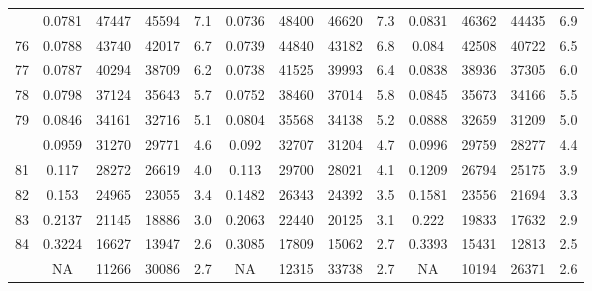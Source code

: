 \documentclass[
  14pt,
]{article}
\begin{document}
\begin{longtable}[t]{lcccccccccccc}
\addlinespace
75 & 0.0781 & 47447 & 45594 & 7.1 & 0.0736 & 48400 & 46620 & 7.3 & 0.0831 & 46362 & 44435 & 6.9\\
76 & 0.0788 & 43740 & 42017 & 6.7 & 0.0739 & 44840 & 43182 & 6.8 & 0.084 & 42508 & 40722 & 6.5\\
77 & 0.0787 & 40294 & 38709 & 6.2 & 0.0738 & 41525 & 39993 & 6.4 & 0.0838 & 38936 & 37305 & 6.0\\
78 & 0.0798 & 37124 & 35643 & 5.7 & 0.0752 & 38460 & 37014 & 5.8 & 0.0845 & 35673 & 34166 & 5.5\\
79 & 0.0846 & 34161 & 32716 & 5.1 & 0.0804 & 35568 & 34138 & 5.2 & 0.0888 & 32659 & 31209 & 5.0\\
\addlinespace
80 & 0.0959 & 31270 & 29771 & 4.6 & 0.092 & 32707 & 31204 & 4.7 & 0.0996 & 29759 & 28277 & 4.4\\
81 & 0.117 & 28272 & 26619 & 4.0 & 0.113 & 29700 & 28021 & 4.1 & 0.1209 & 26794 & 25175 & 3.9\\
82 & 0.153 & 24965 & 23055 & 3.4 & 0.1482 & 26343 & 24392 & 3.5 & 0.1581 & 23556 & 21694 & 3.3\\
83 & 0.2137 & 21145 & 18886 & 3.0 & 0.2063 & 22440 & 20125 & 3.1 & 0.222 & 19833 & 17632 & 2.9\\
84 & 0.3224 & 16627 & 13947 & 2.6 & 0.3085 & 17809 & 15062 & 2.7 & 0.3393 & 15431 & 12813 & 2.5\\
\addlinespace
85 & NA & 11266 & 30086 & 2.7 & NA & 12315 & 33738 & 2.7 & NA & 10194 & 26371 & 2.6\\*
\end{longtable}
\end{document}
